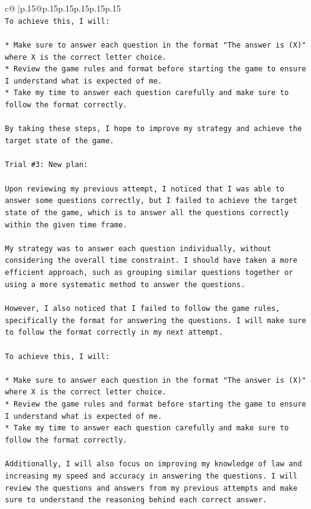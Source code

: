 \documentclass{article}
\begin{document}
{\begin{supertabular}{c@{$\;$}|p{.15\linewidth}@{}p{.15\linewidth}p{.15\linewidth}p{.15\linewidth}p{.15\linewidth}p{.15\linewidth}}
{{{\\ 
\texttt{To achieve this, I will:} \\
\\ 
\texttt{* Make sure to answer each question in the format "The answer is (X)" where X is the correct letter choice.} \\
\texttt{* Review the game rules and format before starting the game to ensure I understand what is expected of me.} \\
\texttt{* Take my time to answer each question carefully and make sure to follow the format correctly.} \\
\\ 
\texttt{By taking these steps, I hope to improve my strategy and achieve the target state of the game.} \\
\\ 
\texttt{Trial \#3: New plan: } \\
\\ 
\texttt{Upon reviewing my previous attempt, I noticed that I was able to answer some questions correctly, but I failed to achieve the target state of the game, which is to answer all the questions correctly within the given time frame. } \\
\\ 
\texttt{My strategy was to answer each question individually, without considering the overall time constraint. I should have taken a more efficient approach, such as grouping similar questions together or using a more systematic method to answer the questions.} \\
\\ 
\texttt{However, I also noticed that I failed to follow the game rules, specifically the format for answering the questions. I will make sure to follow the format correctly in my next attempt.} \\
\\ 
\texttt{To achieve this, I will:} \\
\\ 
\texttt{* Make sure to answer each question in the format "The answer is (X)" where X is the correct letter choice.} \\
\texttt{* Review the game rules and format before starting the game to ensure I understand what is expected of me.} \\
\texttt{* Take my time to answer each question carefully and make sure to follow the format correctly.} \\
\\ 
\texttt{Additionally, I will also focus on improving my knowledge of law and increasing my speed and accuracy in answering the questions. I will review the questions and answers from my previous attempts and make sure to understand the reasoning behind each correct answer.} \\
}}}
\end{supertabular}}
\end{document}
